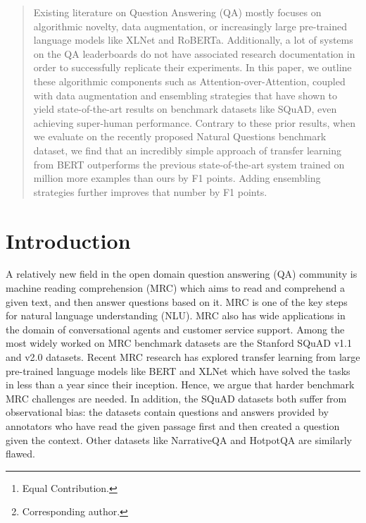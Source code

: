 \documentclass[letterpaper]{article} \usepackage{aaai20}  \usepackage{times}  \usepackage{helvet} \usepackage{courier}  \usepackage[hyphens]{url}  \usepackage{graphicx} \urlstyle{rm} \def\UrlFont{\rm}  \usepackage{graphicx}  \frenchspacing  \setlength{\pdfpagewidth}{8.5in}  \setlength{\pdfpageheight}{11in}  \usepackage{amsmath}
\author{Lin Pan\thanks{Equal Contribution.}, Rishav Chakravarti\footnotemark[1], Anthony Ferritto, Michael Glass,\\
 \Large{\textbf{Alfio Gliozzo, Salim Roukos, Radu Florian, Avirup Sil\thanks{ Corresponding author.}}}\\ IBM Research AI\\
Yorktown Heights, NY\\
\{panl, rchakravarti, mrglass, gliozzo, roukos, raduf, avi\}@us.ibm.com \\
aferritto@ibm.com }
\begin{document}
\maketitle

\begin{abstract}
Existing literature on Question Answering (QA) mostly focuses on algorithmic novelty, data augmentation, or increasingly large pre-trained language models like XLNet and RoBERTa. Additionally, a lot of systems on the QA leaderboards do not have associated research documentation in order to successfully replicate their experiments. In this paper, we outline these algorithmic components such as Attention-over-Attention, coupled with data augmentation and ensembling strategies that have shown to yield state-of-the-art results on benchmark datasets like SQuAD, even achieving super-human performance. Contrary to these prior results, when we evaluate on the recently proposed Natural Questions benchmark dataset, we find that an incredibly simple approach of transfer learning from BERT outperforms the previous state-of-the-art system trained on  million more examples than ours by  F1 points. Adding ensembling strategies further improves that number by  F1 points. 





















\end{abstract}



\section{Introduction}
\label{sec:intro}

A relatively new field in the open domain question answering (QA) community is machine reading comprehension (MRC) which aims to read and comprehend a given text, and then answer questions based on it. MRC is one of the key steps for natural language understanding (NLU). MRC also has wide applications in the domain of conversational agents and customer service support. Among the most widely worked on MRC benchmark datasets are the Stanford SQuAD v1.1 \cite{Rajpurkar_2016} and v2.0 \cite{rajpurkar2018know} datasets. Recent MRC research has explored transfer learning from large pre-trained language models like BERT \cite{Devlin2018BERTPO} and XLNet \cite{xlnet} which have solved the tasks in less than a year since their inception. Hence, we argue that harder benchmark MRC challenges are needed. In addition, the SQuAD datasets both suffer from observational bias: the datasets contain questions and answers provided by annotators who have read the given passage first and then created a question given the context. Other datasets like NarrativeQA \cite{kovcisky2018narrativeqa} and HotpotQA \cite{yang2018hotpotqa} are similarly flawed.
\end{document}
